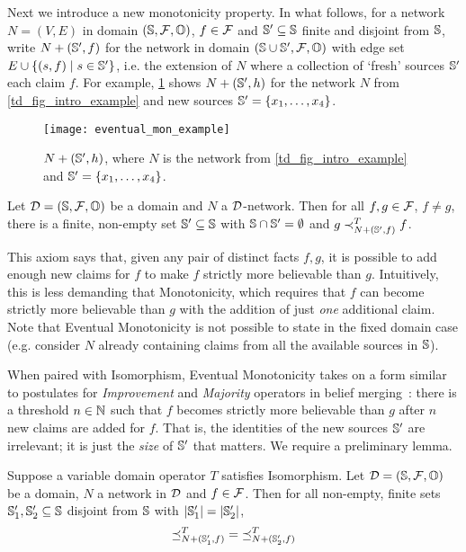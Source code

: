 Next we introduce a new monotonicity property. In what follows, for a network
$N = (V, E)$ in domain $(\S, \F, \O)$, $f \in \F$ and $\S' \subseteq \uS$
finite and disjoint from $\S$, write $N + (\S', f)$ for the network in domain
$(\S \cup \S', \F, \O)$ with edge set $E \cup \{(s, f) \mid s \in \S'\}$, i.e.
the extension of $N$ where a collection of `fresh' sources $\S'$ each claim
$f$. For example, \cref{td_fig_eventual_mon_example} shows $N + (\S', h)$ for the
network $N$ from \cref{td_fig_intro_example} and new sources $\S' = \{x_1, \ldots,
x_4\}$.

\begin{figure}[b]
\centering
\texttt{[image: eventual\_mon\_example]}
\caption{
    $N + (\S', h)$, where $N$ is the network from \cref{td_fig_intro_example} and
    $\S' = \{x_1, \ldots, x_4\}$.
}
\label{td_fig_eventual_mon_example}
\end{figure}

\begin{axiom}
    Let $\D = (\S, \F, \O)$ be a domain and $N$ a $\D$-network. Then for all
    $f, g \in \F$, $f \ne g$, there is a finite, non-empty set $\S' \subseteq
    \uS$ with $\S \cap \S' = \emptyset$ and $g \flt_{N + (\S', f)}^T f$.
\end{axiom}

This axiom says that, given any pair of distinct facts $f, g$, it is possible
to add enough new claims for $f$ to make $f$ strictly more believable than $g$.
Intuitively, this is less demanding that Monotonicity, which requires that $f$
can become strictly more believable than $g$ with the addition of just
\emph{one} additional claim. Note that Eventual Monotonicity is not possible to
state in the fixed domain case (e.g. consider $N$ already containing claims
from all the available sources in $\S$).

When paired with Isomorphism, Eventual Monotonicity takes on a form similar to
postulates for \emph{Improvement} and \emph{Majority} operators in belief
merging~\cite{koniecznyP08_improvement,konieczny2002merging}: there is a
threshold $n \in \Nat$ such that $f$ becomes strictly more believable than $g$
after $n$ new claims are added for $f$. That is, the identities of the new
sources $\S'$ are irrelevant; it is just the \emph{size} of $\S'$ that matters.
We require a preliminary lemma.

\begin{lemma}
    \label{td_lemma_isomorphism_var_op}
    Suppose a variable domain operator $T$ satisfies Isomorphism. Let $\D = (\S,
    \F, \O)$ be a domain, $N$ a network in $\D$ and $f \in \F$. Then for all
    non-empty, finite sets $\S'_1, \S'_2 \subseteq \uS$ disjoint from $\S$ with
    $|\S'_1| = |\S'_2|$,
    \[
        {\fle_{N + (\S'_1, f)}^T}
        =
        {\fle_{N + (\S'_2, f)}^T}
    \]
\end{lemma}

